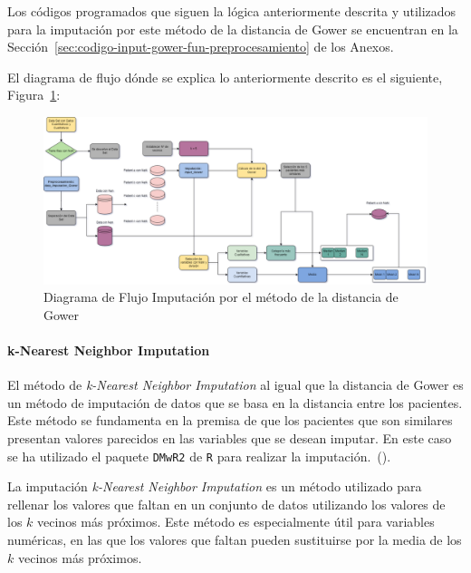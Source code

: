 Los códigos programados que siguen la lógica anteriormente descrita y utilizados para la imputación por este método de la distancia de Gower se encuentran en la Sección~\ref{sec:codigo-input-gower-fun-preprocesamiento} de los Anexos.

El diagrama de flujo dónde se explica lo anteriormente descrito es el siguiente, Figura~\ref{fig:gower-diagram}:

\newpage
\thispagestyle{empty}

\begin{landscape}
    \begin{figure}[H]
        \centering
        \includegraphics[scale = 0.5]{./img/gower-diagram.png}
        \caption{Diagrama de Flujo Imputación por el método de la distancia de Gower}
        \label{fig:gower-diagram}
    \end{figure}
\end{landscape}
\restoregeometry 



\paragraph{k-Nearest Neighbor Imputation}\label{sec:k_Nearest Neighbor_Imputation}

El método de \textit{k-Nearest Neighbor Imputation} al igual que la distancia de Gower es un método de imputación de datos que se basa en la distancia entre los pacientes. Este método se fundamenta en la premisa de que los pacientes que son similares presentan valores parecidos en las variables que se desean imputar. En este caso se ha utilizado el paquete \texttt{DMwR2} de \texttt{R} para realizar la imputación.~(\cite{DMwR2}).

La imputación \textit{k-Nearest Neighbor Imputation} es un método utilizado para rellenar los valores que faltan en un conjunto de datos utilizando los valores de los $k$ vecinos más próximos. Este método es especialmente útil para variables numéricas, en las que los valores que faltan pueden sustituirse por la media de los $k$ vecinos más próximos.

